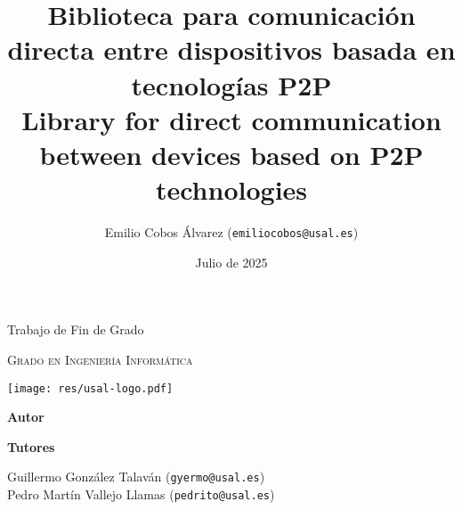 \documentclass[12pt,a4paper]{report}
\title{
  \textbf{Biblioteca para comunicación directa entre dispositivos basada en tecnologías P2P} \\
  \vspace{\parskip}
  \small Library for direct communication between devices based on P2P technologies
}
\author{
  Emilio Cobos Álvarez (\texttt{emiliocobos@usal.es})
}
\date{Julio de 2025}
\begin{document}
 

\begin{titlepage}
\begin{center}
  {\Large \thetitle}

  \vspace*{\fill}

  {\large Trabajo de Fin de Grado}

  \textsc{Grado en Ingeniería Informática}

  \vspace{2em}

  \texttt{[image: res/usal-logo.pdf]}

  \vspace{2em}

  \thedate

  \vspace*{\fill}

  {\large \textbf{Autor}}

  \theauthor

  \vspace{\parskip}

  {\large \textbf{Tutores}}

  Guillermo González Talaván (\texttt{gyermo@usal.es}) \\ Pedro Martín Vallejo Llamas (\texttt{pedrito@usal.es})
\end{center}
\end{titlepage}



\clearpage



\clearpage


\tableofcontents


\end{document}
